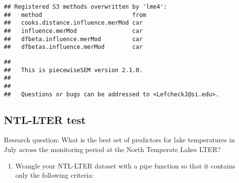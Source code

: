 \documentclass[]{article}
\newenvironment{Shaded}{\begin{snugshade}}{\end{snugshade}}
\newcommand{\KeywordTok}[1]{\textcolor[rgb]{0.13,0.29,0.53}{\textbf{#1}}}
\newcommand{\DataTypeTok}[1]{\textcolor[rgb]{0.13,0.29,0.53}{#1}}
\newcommand{\DecValTok}[1]{\textcolor[rgb]{0.00,0.00,0.81}{#1}}
\newcommand{\StringTok}[1]{\textcolor[rgb]{0.31,0.60,0.02}{#1}}
\newcommand{\CommentTok}[1]{\textcolor[rgb]{0.56,0.35,0.01}{\textit{#1}}}
\newcommand{\OperatorTok}[1]{\textcolor[rgb]{0.81,0.36,0.00}{\textbf{#1}}}
\newcommand{\NormalTok}[1]{#1}
\providecommand{\tightlist}{%
  \setlength{\itemsep}{0pt}\setlength{\parskip}{0pt}}
\begin{document}
\begin{verbatim}
## Registered S3 methods overwritten by 'lme4':
##   method                          from
##   cooks.distance.influence.merMod car 
##   influence.merMod                car 
##   dfbeta.influence.merMod         car 
##   dfbetas.influence.merMod        car
\end{verbatim}

\begin{verbatim}
## 
##   This is piecewiseSEM version 2.1.0.
## 
## 
##   Questions or bugs can be addressed to <LefcheckJ@si.edu>.
\end{verbatim}

\begin{Shaded}
\end{Shaded}

\subsection{NTL-LTER test}\label{ntl-lter-test}

Research question: What is the best set of predictors for lake
temperatures in July across the monitoring period at the North Temperate
Lakes LTER?

\begin{enumerate}
\def\labelenumi{\arabic{enumi}.}
\setcounter{enumi}{2}
\tightlist
\item
  Wrangle your NTL-LTER dataset with a pipe function so that it contains
  only the following criteria:
\end{enumerate}
\end{document}
